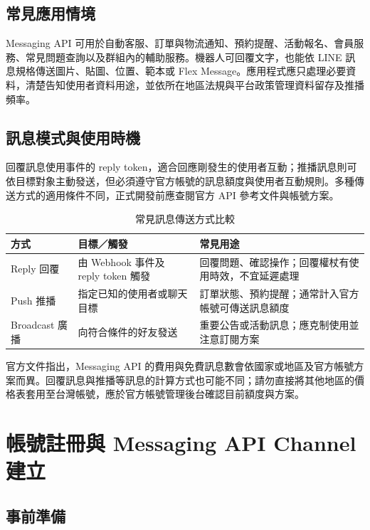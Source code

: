 \documentclass[a4paper,12pt]{report}
\begin{document}
\section{常見應用情境}

Messaging API 可用於自動客服、訂單與物流通知、預約提醒、活動報名、會員服務、常見問題查詢以及群組內的輔助服務。機器人可回覆文字，也能依 LINE 訊息規格傳送圖片、貼圖、位置、範本或 Flex Message。應用程式應只處理必要資料，清楚告知使用者資料用途，並依所在地區法規與平台政策管理資料留存及推播頻率。

\section{訊息模式與使用時機}

回覆訊息使用事件的 reply token，適合回應剛發生的使用者互動；推播訊息則可依目標對象主動發送，但必須遵守官方帳號的訊息額度與使用者互動規則。多種傳送方式的適用條件不同，正式開發前應查閱官方 API 參考文件與帳號方案。

\begin{table}[htbp]
\centering
\caption{常見訊息傳送方式比較}
\label{tab:message-types}
\begin{tabular}{|p{}|p{}|p{}|}
\hline
\textbf{方式} & \textbf{目標／觸發} & \textbf{常見用途} \\
\hline
Reply 回覆 & 由 Webhook 事件及 reply token 觸發 & 回覆問題、確認操作；回覆權杖有使用時效，不宜延遲處理 \\
\hline
Push 推播 & 指定已知的使用者或聊天目標 & 訂單狀態、預約提醒；通常計入官方帳號可傳送訊息額度 \\
\hline
Broadcast 廣播 & 向符合條件的好友發送 & 重要公告或活動訊息；應克制使用並注意訂閱方案 \\
\hline
\end{tabular}
\end{table}

官方文件指出，Messaging API 的費用與免費訊息數會依國家或地區及官方帳號方案而異。回覆訊息與推播等訊息的計算方式也可能不同；請勿直接將其他地區的價格表套用至台灣帳號，應於官方帳號管理後台確認目前額度與方案。

\chapter{帳號註冊與 Messaging API Channel 建立}

\section{事前準備}
\end{document}
